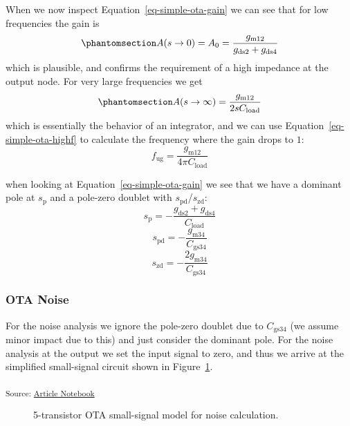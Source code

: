 \documentclass[
  a4paper,
  DIV=11,
  numbers=noendperiod]{scrartcl}
\begin{document}
When we now inspect Equation~\ref{eq-simple-ota-gain} we can see that
for low frequencies the gain is
\begin{equation}\phantomsection\label{eq-simple-ota-gain-dc}{
A(s \rightarrow 0) = A_0 = \frac{g_\mathrm{m12}}{g_\mathrm{ds2} + g_\mathrm{ds4}}
}\end{equation} which is plausible, and confirms the requirement of a
high impedance at the output node. For very large frequencies we get
\begin{equation}\phantomsection\label{eq-simple-ota-highf}{
A (s \rightarrow \infty) = \frac{g_\mathrm{m12}}{2 s C_\mathrm{load}}
}\end{equation} which is essentially the behavior of an integrator, and
we can use Equation~\ref{eq-simple-ota-highf} to calculate the frequency
where the gain drops to \(1\): \[
f_\mathrm{ug} = \frac{g_\mathrm{m12}}{4 \pi C_\mathrm{load}}
\]

when looking at Equation~\ref{eq-simple-ota-gain} we see that we have a
dominant pole at \(s_\mathrm{p}\) and a pole-zero doublet with
\(s_\mathrm{pd}\)/\(s_\mathrm{zd}\): \[
s_\mathrm{p} = -\frac{g_\mathrm{ds2} + g_\mathrm{ds4}}{C_\mathrm{load}}
\] \[
s_\mathrm{pd} = -\frac{g_\mathrm{m34}}{C_\mathrm{gs34}}
\] \[
s_\mathrm{zd} = -\frac{2 g_\mathrm{m34}}{C_\mathrm{gs34}}
\]

\subsubsection{OTA Noise}\label{ota-noise}

For the noise analysis we ignore the pole-zero doublet due to
\(C_\mathrm{gs34}\) (we assume minor impact due to this) and just
consider the dominant pole. For the noise analysis at the output we set
the input signal to zero, and thus we arrive at the simplified
small-signal circuit shown in
Figure~\ref{fig-basic-ota-small-signal-noise}.

\textsubscript{Source:
\href{https://iic-jku.github.io/analog-circuit-design/index.qmd.html}{Article
Notebook}}

\begin{figure}[H]


\caption{\label{fig-basic-ota-small-signal-noise}5-transistor OTA
small-signal model for noise calculation.}

\end{figure}%
\end{document}

